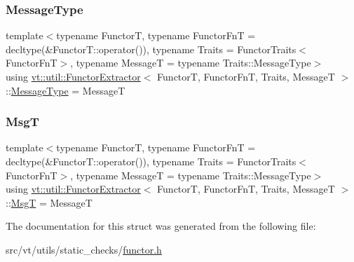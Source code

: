 \mbox{\label{structvt_1_1util_1_1_functor_extractor_a6da3f67871dbf871f832dd5efad726d4}} 
\subsubsection{\texorpdfstring{Message\+Type}{MessageType}}
{\footnotesize\ttfamily template$<$typename FunctorT, typename Functor\+FnT = decltype(\&\+Functor\+T\+::operator()), typename Traits = Functor\+Traits$<$\+Functor\+Fn\+T$>$, typename MessageT = typename Traits\+::\+Message\+Type$>$ \\
using \hyperlink{structvt_1_1util_1_1_functor_extractor}{vt\+::util\+::\+Functor\+Extractor}$<$ FunctorT, Functor\+FnT, Traits, MessageT $>$\+::\hyperlink{structvt_1_1util_1_1_functor_extractor_a6da3f67871dbf871f832dd5efad726d4}{Message\+Type} =  MessageT}

\mbox{\label{structvt_1_1util_1_1_functor_extractor_a6806fe1c31dcbaaeb42221844a396caa}} 
\subsubsection{\texorpdfstring{MsgT}{MsgT}}
{\footnotesize\ttfamily template$<$typename FunctorT, typename Functor\+FnT = decltype(\&\+Functor\+T\+::operator()), typename Traits = Functor\+Traits$<$\+Functor\+Fn\+T$>$, typename MessageT = typename Traits\+::\+Message\+Type$>$ \\
using \hyperlink{structvt_1_1util_1_1_functor_extractor}{vt\+::util\+::\+Functor\+Extractor}$<$ FunctorT, Functor\+FnT, Traits, MessageT $>$\+::\hyperlink{structvt_1_1util_1_1_functor_extractor_a6806fe1c31dcbaaeb42221844a396caa}{MsgT} =  MessageT}



The documentation for this struct was generated from the following file\+:\begin{DoxyCompactItemize}
\item 
src/vt/utils/static\+\_\+checks/\hyperlink{functor_8h}{functor.\+h}\end{DoxyCompactItemize}
